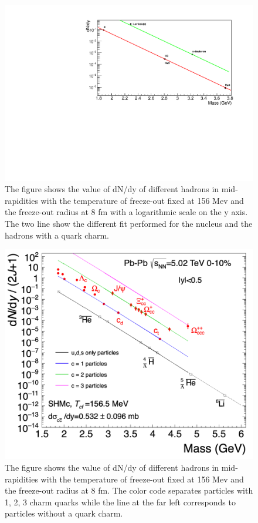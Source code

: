 \documentclass[12pt,a4paper]{book}
\begin{document}
		\begin{figure}
			\centering
		\includegraphics[width=0.7 \linewidth]{pictures/first_graph.pdf}
		\caption{The figure shows the value of dN/dy of different hadrons in mid-rapidities with the temperature of freeze-out fixed at 156 Mev and the freeze-out radius at 8 fm with a logarithmic scale on the y axis. The two line show the different fit performed for the nucleus and the hadrons with a quark charm.}
		\label{fig:first_graph}
	\end{figure}
			\begin{figure}
				\centering
		\includegraphics[width=0.7 \linewidth]{pictures/first_graph_comp.png}
		\caption{The figure shows the value of dN/dy of different hadrons in mid-rapidities with the temperature of freeze-out fixed at 156 Mev and the freeze-out radius at 8 fm. The color code separates particles with 1, 2, 3 charm quarks while the line at the far left corresponds to particles without a quark charm.}
		\label{fig:first_graph_comp}
	\end{figure}
\end{document}
